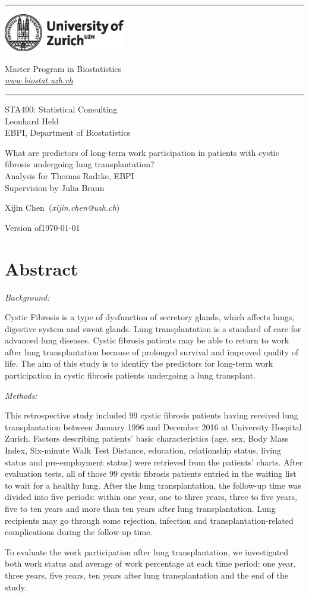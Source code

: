 \documentclass[11pt, a4paper]{article}\usepackage[]{graphicx}\usepackage[]{color}
\makeatletter
\newcommand{\name}{Xijin Chen}
\newcommand{\mail}{xijin.chen@uzh.ch}
\newcommand{\versiondate}{\today}
\newcommand{\client}{Thomas Radtke}
\newcommand{\clinic}{EBPI} %
\newcommand{\supervisor}{Julia Braun}
\newcommand{\projecttitle}{What are predictors of long-term work participation in patients with cystic fibrosis undergoing lung transplantation?}
\newcommand{\subtitle}{STA490: Statistical Consulting \\[.15cm]
  {\Large Leonhard Held} \\[.25cm] 
   {\large EBPI, Department of Biostatistics}}
\newcommand{\web}{www.biostat.uzh.ch}
\newcommand{\grp}{Master Program in Biostatistics}
\newcommand{\img}{\includegraphics[height=17mm, width = 53mm]{uzh_logo_e_pos}}
\newcommand{\of}{of\xspace}
\newcommand{\HRule}{\rule{\linewidth}{0.5mm}}
\newcommand{\mytitle}[3]{
\begin{center}
\vspace*{-2.1cm}

\HRule

\vspace*{0.4cm}

\begin{minipage}{0.4\textwidth}
\thispagestyle{empty}
\begin{flushleft}
\hspace*{1cm}\img
\end{flushleft}
\end{minipage}
\begin{minipage}{0.59\textwidth}
\begin{flushleft} \large
    \hspace*{3.8cm} \textsf{\grp} \\
    \hspace*{3.8cm} \href{http://\web}{\textsf{\emph{\web}}}
\end{flushleft}
\end{minipage}

\vspace*{0.4cm} \HRule

\bigskip

\textsf{\LARGE #2} \vspace*{0.5cm}

\large{#1}

\medskip

\large{\name \ (\textit{\mail})}

\medskip

Version \of \versiondate

\end{center}

\medskip
}
\makeatother
\begin{document}
\pagestyle{standard}
\mytitle{\projecttitle\\[.25cm] Analysis for \client, \clinic \\[.25cm] Supervision by \supervisor}{\subtitle}

\bigskip










\section{Abstract} \label{sec:abstract}

\textit{Background:}

Cystic Fibrosis is a type of dysfunction of secretory glands, which affects lungs, digestive system and sweat glands. Lung transplantation is a standard of care for advanced lung diseases. Cystic fibrosis patients may be able to return to work after lung transplantation because of prolonged survival and improved quality of life. The aim of this study is to identify the predictors for long-term work participation in cystic fibrosis patients undergoing a lung transplant.


\textit{Methods:}

This retrospective study included 99 cystic fibrosis patients having received lung transplantation between January 1996 and December 2016 at University Hospital Zurich. Factors describing patients' basic characteristics (age, sex, Body Mass Index, Six-minute Walk Test Distance, education, relationship status, living status and pre-employment status) were retrieved from the patients' charts. After evaluation tests, all of those 99 cystic fibrosis patients entried in the waiting list to wait for a healthy lung. After the lung transplantation, the follow-up time was divided into five periods: within one year, one to three years, three to five years, five to ten years and more than ten years after lung transplantation. Lung recipients may go through some rejection, infection and transplantation-related complications during the follow-up time.

To evaluate the work participation after lung transplantation, we investigated both work status and average of work percentage at each time period: one year, three years, five years, ten years after lung transplantation and the end of the study.
\end{document}
